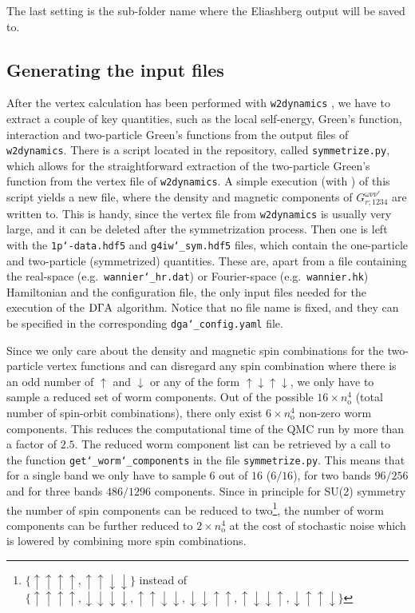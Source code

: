 \documentclass[../../main.tex]{subfiles}
\begin{document}
The last setting is the sub-folder name where the Eliashberg output will be saved to.
 
\subsection{Generating the input files}

After the vertex calculation has been performed with \texttt{w2dynamics} \cite{Wallerberger2019}, we have to extract a couple of key quantities, such as the local self-energy, Green's function, interaction and two-particle Green's functions from the output files of \texttt{w2dynamics}. There is a script located in the repository, called \texttt{symmetrize.py}, which allows for the straightforward extraction of the two-particle Green's function from the vertex file of \texttt{w2dynamics}. A simple execution (with ) of this script yields a new file, where the density and magnetic components of $G^{\omega\nu\nu'}_{r;\mathfrak{1234}}$ are written to. This is handy, since the vertex file from \texttt{w2dynamics} is usually very large, and it can be deleted after the symmetrization process. Then one is left with the \texttt{1p\char`-data.hdf5} and \texttt{g4iw\char`_sym.hdf5} files, which contain the one-particle and two-particle (symmetrized) quantities. These are, apart from a file containing the real-space (e.g.\ \texttt{wannier\char`_hr.dat}) or Fourier-space (e.g.\ \texttt{wannier.hk}) Hamiltonian and the configuration file, the only input files needed for the execution of the $\text{D}\Gamma\text{A}$ algorithm. Notice that no file name is fixed, and they can be specified in the corresponding \texttt{dga\char`_config.yaml} file.

Since we only care about the density and magnetic spin combinations for the two-particle vertex functions and can disregard any spin combination where there is an odd number of $\uparrow$ and $\downarrow$ or any of the form $\uparrow\downarrow\uparrow\downarrow$, we only have to sample a reduced set of worm components. Out of the possible $16 \times n_{\mathrm{o}}^4$ (total number of spin-orbit combinations), there only exist $6\times n_{\mathrm{o}}^4$ non-zero worm components. This reduces the computational time of the QMC run by more than a factor of $2.5$. The reduced worm component list can be retrieved by a call to the function \texttt{get\char`_worm\char`_components} in the file \texttt{symmetrize.py}. This means that for a single band we only have to sample $6$ out of $16$ ($6/16$), for two bands $96/256$ and for three bands $486/1296$ components. Since in principle for SU(2) symmetry the number of spin components can be reduced to two\footnote{$\{\uparrow\uparrow\uparrow\uparrow, \uparrow\uparrow\downarrow\downarrow\}$ instead of $\{\uparrow\uparrow\uparrow\uparrow,\downarrow\downarrow\downarrow\downarrow,\uparrow\uparrow\downarrow\downarrow,\downarrow\downarrow\uparrow\uparrow,\uparrow\downarrow\downarrow\uparrow, \downarrow\uparrow\uparrow\downarrow\}$}, the number of worm components can be further reduced to $2\times n_{\mathrm{o}}^4$ at the cost of stochastic noise which is lowered by combining more spin combinations.
\end{document}
